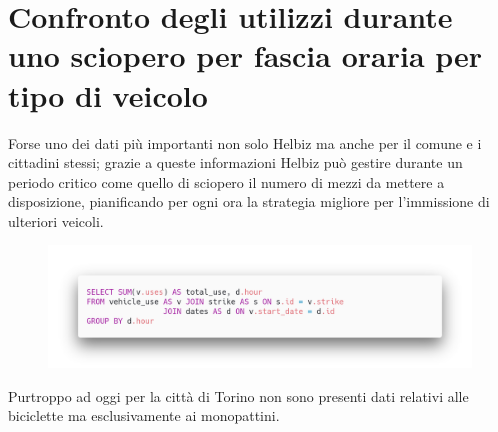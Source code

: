 \section{Confronto degli utilizzi durante uno sciopero per fascia oraria per tipo di veicolo}
Forse uno dei dati più importanti non solo Helbiz ma anche per il comune e 
i cittadini stessi; grazie a queste informazioni Helbiz può gestire durante 
un periodo critico come quello di sciopero il numero di mezzi da mettere a disposizione,
pianificando per ogni ora la strategia migliore per l'immissione di ulteriori veicoli.
\begin{figure}[H]                                                                                                                                                            
\centering                                                                                                                                                                   
\includegraphics[width=\textwidth]{images/query3}                                                                                                                                   
\label{fig:query3}                                                                                                                                                           
\end{figure}

Purtroppo ad oggi per la città di Torino non sono presenti dati relativi alle
biciclette ma esclusivamente ai monopattini.

